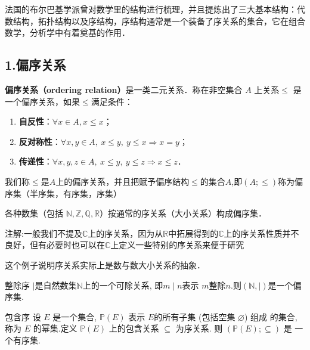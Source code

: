 
\begin{issues}
\issueAbstract
\end{issues}


法国的布尔巴基学派曾对数学里的结构进行梳理，并且提炼出了三大基本结构：代数结构，拓扑结构以及序结构，序结构通常是一个装备了序关系的集合，它在组合数学，分析学中有着奠基的作用．

\subsection{1.偏序关系}
\textbf{偏序关系（ordering relation）}是一类二元关系．称在非空集合 $A$ 上关系$\leq$ 是一个偏序关系，如果$\leq$满足条件：
\begin{enumerate}
\item \textbf{自反性}：$\forall x\in A,x\leq x$；
\item \textbf{反对称性}：$\forall x,y\in A,\ x\leq y,\ y\leq x \Rightarrow x = y $；
\item \textbf{传递性}：$\forall x,y,z\in A,\ x\leq y,\ y\leq z \Rightarrow x\leq z $．
\end{enumerate}
我们称$\leq$是$A$上的偏序关系，并且把赋予偏序结构$\leq$的集合$A$,即$(A;\leq)$称为偏序集（半序集，有序集，序集）
\begin{example}{}
各种数集（包括 $\mathbb{N},\mathbb{Z},\mathbb{Q},\mathbb{R}$）按通常的序关系（大小关系）构成偏序集．

注解:一般我们不提及$\mathbb{C}$上的序关系，因为从$\mathbb{R}$中拓展得到的$\mathbb{C}$上的序关系性质并不良好，但有必要时也可以在$\mathbb{C}$上定义一些特别的序关系来便于研究
\end{example}

这个例子说明序关系实际上是数与数大小关系的抽象．

\begin{example}{整除序}
$\mid$是自然数集$\mathbb{N}$上的一个可除关系, 即$m \mid n$表示 $ m$整除$n$.则$(\mathbb{N},\mid)$是一个偏序集.
\end{example}

\begin{example}{包含序}
设  $E$  是一个集合,  $\mathbb{P}(E)$  表示 $ E  $的所有子集 (包括空集 $ \varnothing  $) 组成 的集合, 称为 $ E $ 的幂集.定义  $\mathbb{P}(E)$  上的包含关系  $\subseteq $ 为序关系. 则  $(\mathbb{P}(E) ; \subseteq) $ 是 一个有序集.
\end{example}

